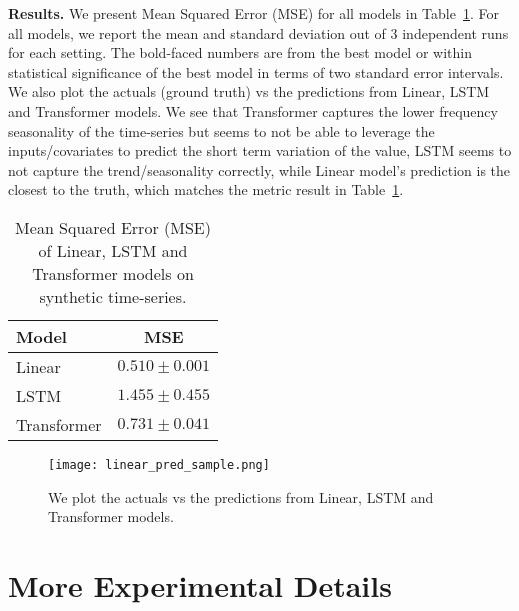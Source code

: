 \documentclass[10pt]{article} \usepackage[accepted]{tmlr}
\theoremstyle{plain}
\theoremstyle{definition}
\theoremstyle{remark}
\begin{document}
{\bf Results.} We present Mean Squared Error (MSE) for all models in Table~\ref{tab:linear_result}. For all models, we report the mean and standard deviation out of 3 independent runs for each setting. The bold-faced numbers are from the best model or within statistical significance of the best model in terms of two standard error intervals. We also plot the actuals (ground truth) vs the predictions from Linear, LSTM and Transformer models. We see that Transformer captures the lower frequency seasonality of the time-series but seems to not be able to leverage the inputs/covariates to predict the short term variation of the value, LSTM seems to not capture the trend/seasonality correctly, while Linear model's prediction is the closest to the truth, which matches the metric result in Table~\ref{tab:linear_result}.
\begin{table}[ht!]
\centering
\begin{tabular}{l|c}
\toprule
Model & MSE \\
\midrule
Linear & $\mathbf{0.510\pm0.001}$\\
LSTM & $1.455\pm0.455$  \\
Transformer & $0.731\pm0.041$  \\
\bottomrule
\end{tabular}
\caption{Mean Squared Error (MSE) of Linear, LSTM and Transformer models on synthetic time-series.}
\label{tab:linear_result}
\end{table}

\begin{figure}[h]
    \centering
    \texttt{[image: linear\_pred\_sample.png]}
    \caption{We plot the actuals vs the predictions from Linear, LSTM and Transformer models.}
    \label{fig:linear_pred_sample}
\end{figure}



\section{More Experimental Details}
\label{app:moreexp}
\end{document}
